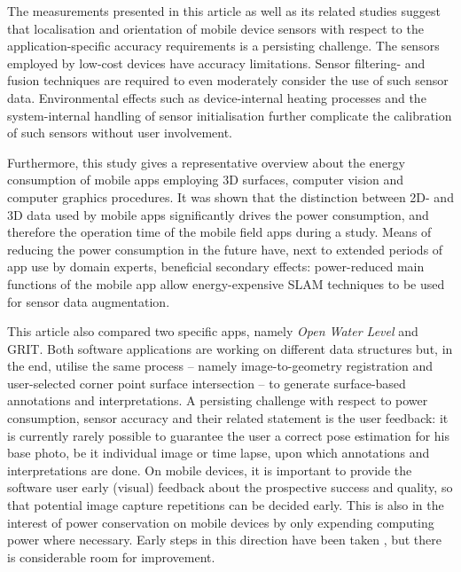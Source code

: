 \documentclass[review]{elsarticle}
\begin{document}
The measurements presented in this article as well as its related studies suggest that localisation and orientation of mobile device sensors with respect to the application-specific accuracy requirements is a persisting challenge. The sensors employed by low-cost devices have accuracy limitations. Sensor filtering- and fusion techniques are required to even moderately consider the use of such sensor data. Environmental effects such as device-internal heating processes and the system-internal handling of sensor initialisation further complicate the calibration of such sensors without user involvement.

Furthermore, this study gives a representative overview about the energy consumption of mobile apps employing 3D surfaces, computer vision and computer graphics procedures. It was shown that the distinction between 2D- and 3D data used by mobile apps significantly drives the power consumption, and therefore the operation time of the mobile field apps during a study. Means of reducing the power consumption in the future have, next to extended periods of app use by domain experts, beneficial secondary effects: power-reduced main functions of the mobile app allow energy-expensive \gls{SLAM} techniques to be used for sensor data augmentation. %

This article also compared two specific apps, namely \textit{Open Water Level} and \gls{GRIT}. Both software applications are working on different data structures but, in the end, utilise the same process -- namely image-to-geometry registration and user-selected corner point surface intersection -- to generate surface-based annotations and interpretations. A persisting challenge with respect to power consumption, sensor accuracy and their related statement is the user feedback: it is currently rarely possible to guarantee the user a correct pose estimation for his base photo, be it individual image or time lapse, upon which annotations and interpretations are done. On mobile devices,  it is important to provide the software user early (visual) feedback about the prospective success and quality, so that potential image capture repetitions can be decided early. This is also in the interest of power conservation on mobile devices by only expending computing power where necessary. Early steps in this direction have been taken \cite{Kehl2017_VGC}, but there is considerable room for improvement.
\end{document}
